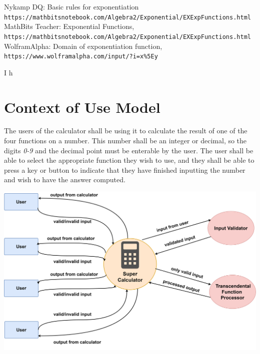 \documentclass[letterpaper, 11pt]{report}
\begin{document}
\begin{thebibliography}{}
Nykamp DQ: Basic rules for exponentiation
\\\texttt{https://mathbitsnotebook.com/Algebra2/Exponential/EXExpFunctions.html}
MathBits Teacher: Exponential Functions,
\\\texttt{https://mathbitsnotebook.com/Algebra2/Exponential/EXExpFunctions.html}
WolframAlpha: Domain of exponentiation function,
\\\texttt{https://www.wolframalpha.com/input/?i=x\%5Ey}
\end{thebibliography}
\newpage
{}I h
\section*{Context of Use Model}
\normalsize{The users of the calculator shall be using it to calculate the result of one of the four functions on a number. This number shall be an integer or decimal, so the digits \textit{0-9} and the decimal point must be enterable by the user. The user shall be able to select the appropriate function they wish to use, and they shall be able to press a key or button to indicate that they have finished inputting the number and wish to have the answer computed.}
\begin{center}
\includegraphics[width=15cm]{context_diagram}
\end{center}
\end{document}
